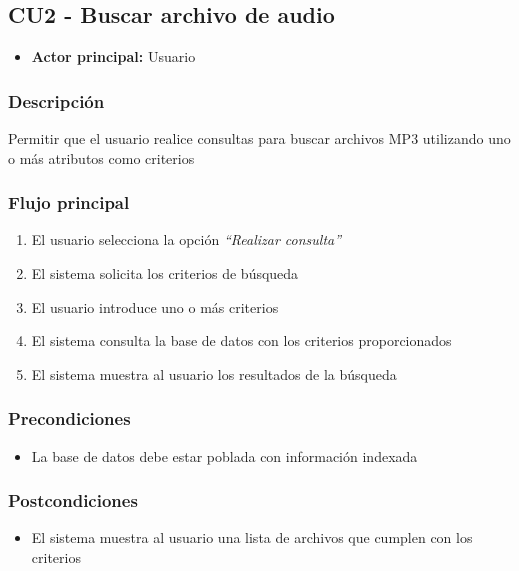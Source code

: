 \bigskip

\subsection*{CU2 - Buscar archivo de audio}
\begin{itemize}
  \item \textbf{Actor principal:} Usuario
\end{itemize}

\subsubsection*{Descripción}
Permitir que el usuario realice consultas para buscar archivos MP3 utilizando uno o más
atributos como criterios

\subsubsection*{Flujo principal}
\begin{enumerate}
  \item El usuario selecciona la opción \textit{\textquotedblleft Realizar consulta\textquotedblright}
  \item El sistema solicita los criterios de búsqueda
  \item El usuario introduce uno o más criterios
  \item El sistema consulta la base de datos con los criterios proporcionados
  \item El sistema muestra al usuario los resultados de la búsqueda
\end{enumerate}

\subsubsection*{Precondiciones}
\begin{itemize}
  \item La base de datos debe estar poblada con información indexada
\end{itemize}

\subsubsection*{Postcondiciones}
\begin{itemize}
  \item El sistema muestra al usuario una lista de archivos que cumplen con los criterios
\end{itemize}